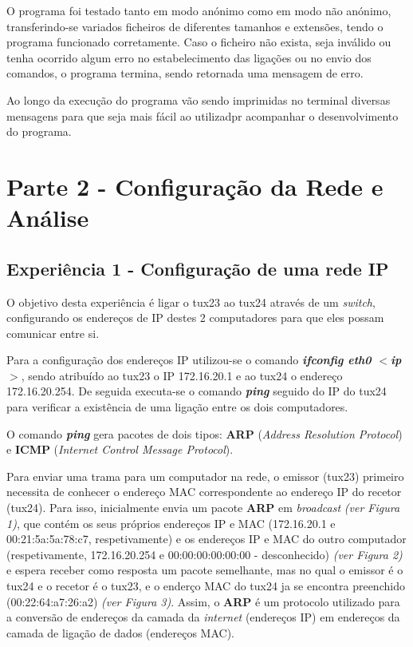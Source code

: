 \documentclass[11pt]{article}
\begin{document}
O programa foi testado tanto em modo anónimo como em modo não anónimo, transferindo-se variados ficheiros de diferentes tamanhos e extensões, tendo o programa funcionado corretamente. Caso o ficheiro não exista, seja inválido ou tenha ocorrido algum erro no estabelecimento das ligações ou no envio dos comandos, o programa termina, sendo retornada uma mensagem de erro. 

Ao longo da execução do programa vão sendo imprimidas no terminal diversas mensagens para que seja mais fácil ao utilizadpr acompanhar o desenvolvimento do programa.

\section{Parte 2 - Configuração da Rede e Análise} 

\subsection{Experiência 1 - Configuração de uma rede IP}

O objetivo desta experiência é ligar o tux23 ao tux24 através de um \textit{switch}, configurando os endereços de IP destes 2 computadores para que eles possam comunicar entre si.

Para a configuração dos endereços IP utilizou-se o comando \textit{\textbf{ifconfig eth0 $<$ip$>$}}, sendo atribuído ao tux23 o IP 172.16.20.1 e ao tux24 o endereço 172.16.20.254. De seguida executa-se o comando \textit{\textbf{ping}} seguido do IP do tux24 para verificar a existência de uma ligação entre os dois computadores. 

O comando \textit{\textbf{ping}} gera pacotes de dois tipos: \textbf{ARP} (\textit{Address Resolution Protocol}) e \textbf{ICMP} (\textit{Internet Control Message Protocol}).

Para enviar uma trama para um computador na rede, o emissor (tux23) primeiro necessita de conhecer o endereço MAC correspondente ao endereço IP do recetor (tux24). Para isso, inicialmente envia um pacote \textbf{ARP} em \textit{broadcast} \textit{(ver Figura 1)}, que contém os seus próprios endereços IP e MAC (172.16.20.1 e 00:21:5a:5a:78:c7, respetivamente) e os endereços IP e MAC do outro computador (respetivamente, 172.16.20.254 e 00:00:00:00:00:00 - desconhecido) \textit{(ver Figura 2)} e espera receber como resposta um pacote semelhante, mas no qual o emissor é o tux24 e o recetor é o tux23, e o enderço MAC do tux24 ja se encontra preenchido (00:22:64:a7:26:a2) \textit{(ver Figura 3)}. Assim, o \textbf{ARP} é um protocolo utilizado para a conversão de endereços da camada da \textit{internet} (endereços IP) em endereços da camada de ligação de dados (endereços MAC). 
\end{document}
